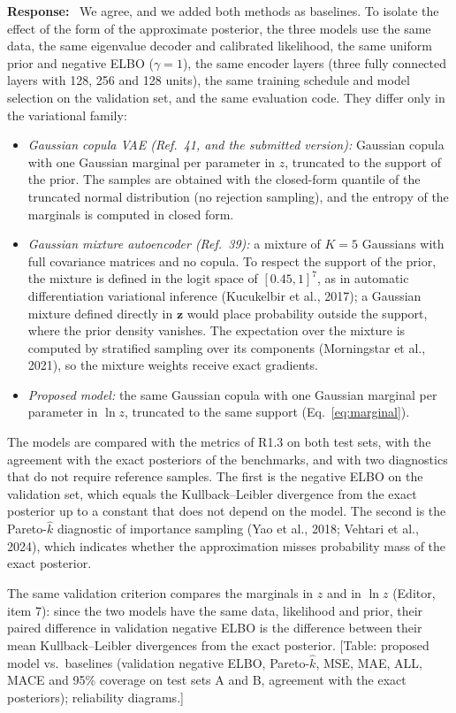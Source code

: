 \documentclass[11pt]{article}
\newenvironment{response}{\par\smallskip\noindent\color{resp}\textbf{Response:}\ }{\par}
\newcommand{\tbd}[1]{\textcolor{note}{\textsf{[#1]}}}
\newcommand{\z}{\mathbf{z}}
\begin{document}
\begin{response}
We agree, and we added both methods as baselines. To isolate the effect of the form of the approximate posterior, the
three models use the same data, the same eigenvalue decoder and calibrated likelihood, the same uniform prior and
negative ELBO ($\gamma=1$), the same encoder layers (three fully connected layers with 128, 256 and 128 units), the same
training schedule and model selection on the validation set, and the same evaluation code. They differ only in the
variational family:
\begin{itemize}[leftmargin=*]
\item \emph{Gaussian copula VAE (Ref.~41, and the submitted version):} Gaussian copula with one Gaussian marginal per
parameter in $z$, truncated to the support of the prior. The samples are obtained with the closed-form quantile of the
truncated normal distribution (no rejection sampling), and the entropy of the marginals is computed in closed form.
\item \emph{Gaussian mixture autoencoder (Ref.~39):} a mixture of $K=5$ Gaussians with full covariance matrices and no
copula. To respect the support of the prior, the mixture is defined in the logit space of $[0.45,1]^7$, as in automatic
differentiation variational inference (Kucukelbir et al., 2017); a Gaussian mixture defined directly in $\z$ would place
probability outside the support, where the prior density vanishes. The expectation over the mixture is computed by
stratified sampling over its components (Morningstar et al., 2021), so the mixture weights receive exact gradients.
\item \emph{Proposed model:} the same Gaussian copula with one Gaussian marginal per parameter in $\ln z$, truncated to
the same support (Eq.~\eqref{eq:marginal}).
\end{itemize}
The models are compared with the metrics of R1.3 on both test sets, with the agreement with the exact posteriors of the
benchmarks, and with two diagnostics that do not require reference samples. The first is the negative ELBO on the
validation set, which equals the Kullback--Leibler divergence from the exact posterior up to a constant that does not
depend on the model. The second is the Pareto-$\hat{k}$ diagnostic of importance sampling (Yao et al., 2018; Vehtari
et al., 2024), which indicates whether the approximation misses probability mass of the exact posterior.

The same validation criterion compares the marginals in $z$ and in $\ln z$ (Editor, item 7): since the two models have
the same data, likelihood and prior, their paired difference in validation negative ELBO is the difference between
their mean Kullback--Leibler divergences from the exact posterior.
\tbd{Table: proposed model vs.\ baselines (validation negative ELBO, Pareto-$\hat{k}$, MSE, MAE, ALL, MACE and 95\%
coverage on test sets A and B, agreement with the exact posteriors); reliability diagrams.}
\end{response}
\end{document}
